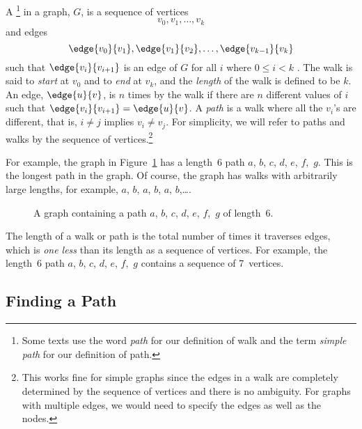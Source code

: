 \begin{definition}\label{def:undirected-path}
A \footnote{Some texts use the word \emph{path} for our
  definition of walk and the term \emph{simple path} for our
  definition of path.} in a graph, $G$, is a sequence of vertices
\begin{equation*}
v_0, v_1, \dots, v_k
\end{equation*}
and edges
\begin{equation*}
    \edge{v_0}{v_1}, \edge{v_1}{v_2}, \dots, \edge{v_{k - 1}}{v_k}
\end{equation*}
such that $\edge{v_i}{v_{i+1}}$ is an edge of $G$ for all $i$ where $0
\leq i < k$ .  The walk is said to \emph{start}
at $v_0$ and to \emph{end} at $v_k$, and the
\emph{length} of the walk is defined to be $k$.
An edge, $\edge{u}{v}$, is  $n$ times by the walk if
there are $n$ different values of $i$ such that $\edge{v_i}{v_{i+1}} =
\edge{u}{v}$.  A \emph{path} is a walk where all the $v_i$'s are
different, that is, $i\neq j$ implies $v_i \neq v_j$.  For simplicity,
we will refer to paths and walks by the sequence of
vertices.\footnote{This works fine for simple graphs since the edges
  in a walk are completely determined by the sequence of vertices and
  there is no ambiguity.  For graphs with multiple edges, we would
  need to specify the edges as well as the nodes.}
\end{definition}

For example, the graph in Figure~\ref{dg} has a length~6 path $a$,
$b$, $c$, $d$, $e$, $f$,~$g$.  This is the longest path in the graph.
Of course, the graph has walks with arbitrarily large lengths, for
example, $a$, $b$, $a$, $b$, $a$, $b$,\dots.

\begin{figure}[htbp]


\caption{A graph containing a path $a$, $b$, $c$, $d$, $e$, $f$,~$g$
  of length~6.}
\label{dg}
\end{figure}

The length of a walk or path is the total number of times it traverses
edges, which is \emph{one less} than its length as a sequence of
vertices.  For example, the length~6 path $a$, $b$, $c$, $d$, $e$,
$f$,~$g$ contains a sequence of 7~vertices.

\subsection{Finding a Path}

